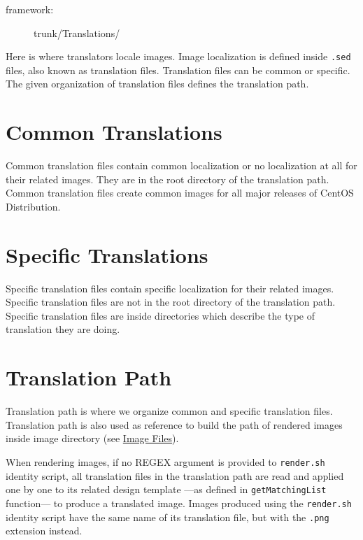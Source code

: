 
\begin{description} 
\item[framework:] trunk/Translations/
\end{description}

\noindent Here is where translators locale images.  Image localization
is defined inside \texttt{.sed} files, also known as translation
files.  Translation files can be common or specific.  The given
organization of translation files defines the translation path.

\section{Common Translations}
\hypertarget{sec:Concepts:Translations:Common}{}

Common translation files contain common localization or no
localization at all for their related images.  They are in the root
directory of the translation path. Common translation files create
common images for all major releases of CentOS Distribution.

\section{Specific Translations}
\hypertarget{sec:Concepts:Translations:Specific}{}

Specific translation files contain specific localization for their
related images. Specific translation files are not in the root
directory of the translation path. Specific translation files are
inside directories which describe the type of translation they are
doing. 

\section{Translation Path}
\hypertarget{sec:Concepts:Translations:Path}{}

Translation path is where we organize common and specific translation
files. Translation path is also used as reference to build the path of
rendered images inside image directory (see
\hyperlink{sec:Concepts:Frameworks:Image}{Image Files}). 

When rendering images, if no REGEX argument is provided to
\texttt{render.sh} identity script, all translation files in the
translation path are read and applied one by one to its related design
template ---as defined in \texttt{getMatchingList} function--- to
produce a translated image. Images produced using the
\texttt{render.sh} identity script have the same name of its
translation file, but with the \texttt{.png} extension instead.

